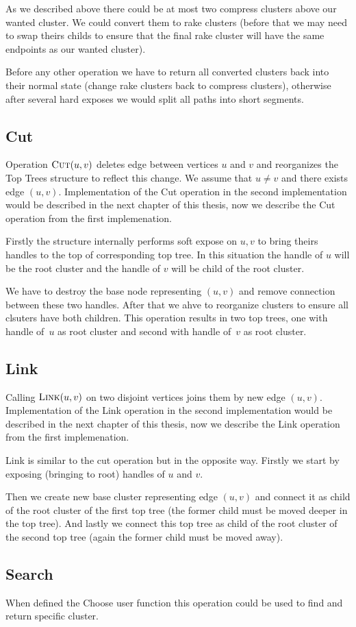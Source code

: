 As we described above there could be at most two compress clusters above our
wanted cluster. We could convert them to rake clusters (before that we may need
to swap theirs childs to ensure that the final rake cluster will have the same
endpoints as our wanted cluster).

Before any other operation we have to return all converted clusters back into
their normal state (change rake clusters back to compress clusters), otherwise
after several hard exposes we would split all paths into short segments.

\subsection{Cut}

Operation $\hbox{\sc Cut}(u,v)$ deletes edge between vertices $u$ and $v$ and reorganizes
the Top Trees structure to reflect this change. We assume that $u\ne v$ and
there exists edge $(u,v)$. Implementation of the Cut operation in the second
implementation would be described in the next chapter of this thesis, now we
describe the Cut operation from the first implemenation.

Firstly the structure internally performs {\I soft expose} on $u,v$ to bring
theirs handles to the top of corresponding top tree. In this situation the
handle of $u$ will be the root cluster and the handle of $v$ will be child of
the root cluster.

We have to destroy the base node representing $(u,v)$ and remove connection
between these two handles. After that we ahve to reorganize clusters to ensure
all clsuters have both children. This operation results in two top trees, one
with handle of~$u$ as root cluster and second with handle of~$v$ as root
cluster.

\subsection{Link}

Calling $\hbox{\sc Link}(u,v)$ on two disjoint vertices joins them by new edge $(u,v)$.
Implementation of the Link operation in the second implementation would be
described in the next chapter of this thesis, now we describe the Link operation
from the first implemenation.

Link is similar to the cut operation but in the opposite way. Firstly we start
by {\I exposing} (bringing to root) handles of $u$ and $v$.

Then we create new base cluster representing edge $(u,v)$ and connect it as
child of the root cluster of the first top tree (the former child must be
moved deeper in the top tree). And lastly we connect this top tree as child of
the root cluster of the second top tree (again the former child must be moved
away).

\subsection{Search}

When defined the {\I Choose} user function this operation could be used to find
and return specific cluster.

